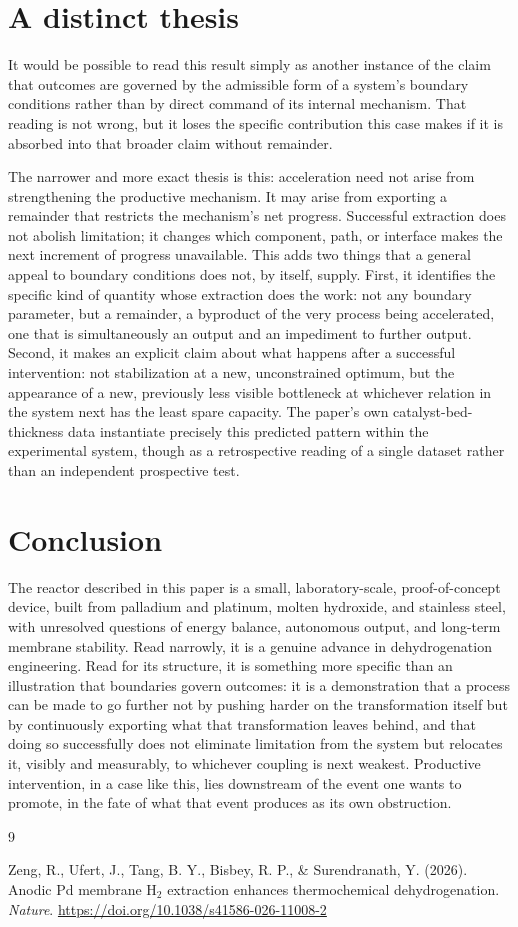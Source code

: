 \documentclass[11pt]{article}
\begin{document}
\section{A distinct thesis}

It would be possible to read this result simply as another instance of the claim that outcomes are governed by the admissible form of a system's boundary conditions rather than by direct command of its internal mechanism. That reading is not wrong, but it loses the specific contribution this case makes if it is absorbed into that broader claim without remainder.

The narrower and more exact thesis is this: acceleration need not arise from strengthening the productive mechanism. It may arise from exporting a remainder that restricts the mechanism's net progress. Successful extraction does not abolish limitation; it changes which component, path, or interface makes the next increment of progress unavailable. This adds two things that a general appeal to boundary conditions does not, by itself, supply. First, it identifies the specific kind of quantity whose extraction does the work: not any boundary parameter, but a remainder, a byproduct of the very process being accelerated, one that is simultaneously an output and an impediment to further output. Second, it makes an explicit claim about what happens after a successful intervention: not stabilization at a new, unconstrained optimum, but the appearance of a new, previously less visible bottleneck at whichever relation in the system next has the least spare capacity. The paper's own catalyst-bed-thickness data instantiate precisely this predicted pattern within the experimental system, though as a retrospective reading of a single dataset rather than an independent prospective test.

\section{Conclusion}

The reactor described in this paper is a small, laboratory-scale, proof-of-concept device, built from palladium and platinum, molten hydroxide, and stainless steel, with unresolved questions of energy balance, autonomous output, and long-term membrane stability. Read narrowly, it is a genuine advance in dehydrogenation engineering. Read for its structure, it is something more specific than an illustration that boundaries govern outcomes: it is a demonstration that a process can be made to go further not by pushing harder on the transformation itself but by continuously exporting what that transformation leaves behind, and that doing so successfully does not eliminate limitation from the system but relocates it, visibly and measurably, to whichever coupling is next weakest. Productive intervention, in a case like this, lies downstream of the event one wants to promote, in the fate of what that event produces as its own obstruction.

\begin{thebibliography}{9}

Zeng, R., Ufert, J., Tang, B. Y., Bisbey, R. P., \& Surendranath, Y. (2026). Anodic Pd membrane H$_2$ extraction enhances thermochemical dehydrogenation. \emph{Nature}. \url{https://doi.org/10.1038/s41586-026-11008-2}

\end{thebibliography}
\end{document}
